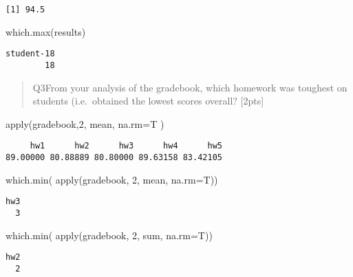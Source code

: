 \documentclass[
  letterpaper,
  DIV=11,
  numbers=noendperiod]{scrartcl}
\newenvironment{Shaded}{\begin{snugshade}}{\end{snugshade}}
\newcommand{\AttributeTok}[1]{\textcolor[rgb]{0.40,0.45,0.13}{#1}}
\newcommand{\DecValTok}[1]{\textcolor[rgb]{0.68,0.00,0.00}{#1}}
\newcommand{\FunctionTok}[1]{\textcolor[rgb]{0.28,0.35,0.67}{#1}}
\newcommand{\NormalTok}[1]{\textcolor[rgb]{0.00,0.23,0.31}{#1}}
\begin{document}
\begin{verbatim}
[1] 94.5
\end{verbatim}

\begin{Shaded}
\begin{Highlighting}[]
\FunctionTok{which.max}\NormalTok{(results)}
\end{Highlighting}
\end{Shaded}

\begin{verbatim}
student-18 
        18 
\end{verbatim}

\begin{quote}
Q3From your analysis of the gradebook, which homework was toughest on
students (i.e.~obtained the lowest scores overall? {[}2pts{]}
\end{quote}

\begin{Shaded}
\begin{Highlighting}[]
\FunctionTok{apply}\NormalTok{(gradebook,}\DecValTok{2}\NormalTok{, mean, }\AttributeTok{na.rm=}\NormalTok{T )}
\end{Highlighting}
\end{Shaded}

\begin{verbatim}
     hw1      hw2      hw3      hw4      hw5 
89.00000 80.88889 80.80000 89.63158 83.42105 
\end{verbatim}

\begin{Shaded}
\begin{Highlighting}[]
\FunctionTok{which.min}\NormalTok{( }\FunctionTok{apply}\NormalTok{(gradebook, }\DecValTok{2}\NormalTok{, mean, }\AttributeTok{na.rm=}\NormalTok{T))}
\end{Highlighting}
\end{Shaded}

\begin{verbatim}
hw3 
  3 
\end{verbatim}

\begin{Shaded}
\begin{Highlighting}[]
\FunctionTok{which.min}\NormalTok{( }\FunctionTok{apply}\NormalTok{(gradebook, }\DecValTok{2}\NormalTok{, sum, }\AttributeTok{na.rm=}\NormalTok{T))}
\end{Highlighting}
\end{Shaded}

\begin{verbatim}
hw2 
  2 
\end{verbatim}
\end{document}
